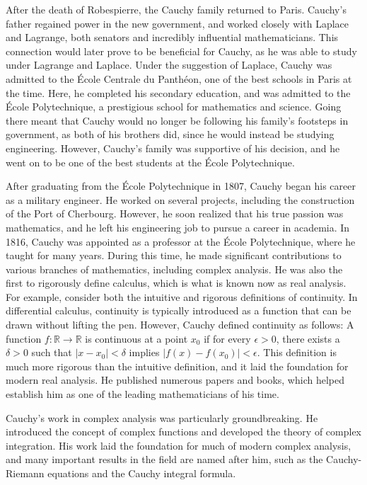 \documentclass[12pt,letterpaper]{article}
\begin{document}
After the death of Robespierre, the Cauchy family returned to Paris.
Cauchy's father regained power in the new government, and worked closely with Laplace and Lagrange, both senators and incredibly influential mathematicians.
This connection would later prove to be beneficial for Cauchy, as he was able to study under Lagrange and Laplace.
Under the suggestion of Laplace, Cauchy was admitted to the École Centrale du Panthéon, one of the best schools in Paris at the time.
Here, he completed his secondary education, and was admitted to the École Polytechnique, a prestigious school for mathematics and science.
Going there meant that Cauchy would no longer be following his family's footsteps in government, as both of his brothers did, since he would instead be studying engineering.
However, Cauchy's family was supportive of his decision, and he went on to be one of the best students at the École Polytechnique.

After graduating from the École Polytechnique in 1807, Cauchy began his career as a military engineer. 
He worked on several projects, including the construction of the Port of Cherbourg. 
However, he soon realized that his true passion was mathematics, and he left his engineering job to pursue a career in academia.
In 1816, Cauchy was appointed as a professor at the École Polytechnique, where he taught for many years. 
During this time, he made significant contributions to various branches of mathematics, including complex analysis.
He was also the first to rigorously define calculus, which is what is known now as real analysis.
For example, consider both the intuitive and rigorous definitions of continuity.
In differential calculus, continuity is typically introduced as a function that can be drawn without lifting the pen.
However, Cauchy defined continuity as follows:
A function $f: \mathbb{R} \to \mathbb{R}$ is continuous at a point $x_0$ if for every $\epsilon > 0$, there exists a $\delta > 0$ such that $|x - x_0| < \delta$ implies $|f(x) - f(x_0)| < \epsilon$.
This definition is much more rigorous than the intuitive definition, and it laid the foundation for modern real analysis.
He published numerous papers and books, which helped establish him as one of the leading mathematicians of his time.

Cauchy's work in complex analysis was particularly groundbreaking.
He introduced the concept of complex functions and developed the theory of complex integration. 
His work laid the foundation for much of modern complex analysis, and many important results in the field are named after him, such as the Cauchy-Riemann equations and the Cauchy integral formula.
\end{document}
